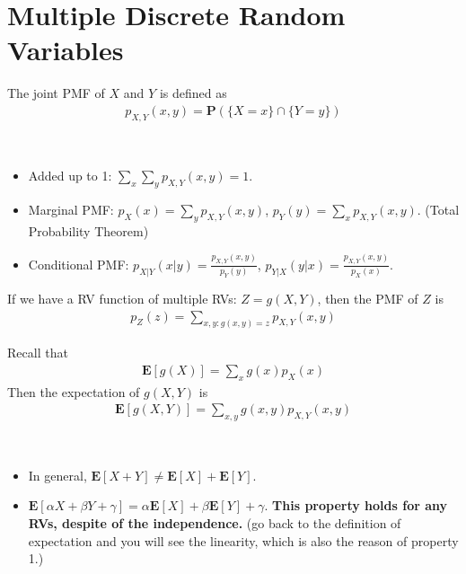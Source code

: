 \section{Multiple Discrete Random Variables}
\begin{definition}
    The joint PMF of $X$ and $Y$ is defined as
    \begin{align}
        p_{X, Y}(x, y) = \mathbf{P}(\{X = x\} \cap \{Y = y\})
    \end{align}
\end{definition}
\begin{property} ~
    \begin{itemize}
        \item Added up to 1: $\sum_x \sum_y p_{X, Y}(x, y) = 1$.
        \item Marginal PMF: $p_{X}(x) = \sum_y p_{X, Y}(x, y)$, $p_{Y}(y) = \sum_x p_{X, Y}(x, y)$. (Total Probability Theorem)
        \item Conditional PMF: $p_{X|Y}(x|y) = \frac{p_{X, Y}(x, y)}{p_{Y}(y)}$, $p_{Y|X}(y|x) = \frac{p_{X, Y}(x, y)}{p_{X}(x)}$.
    \end{itemize}
\end{property}
If we have a RV function of multiple RVs: $Z = g(X, Y)$, then the PMF of $Z$ is
\begin{align}
    p_{Z}(z) = \sum_{x, y: g(x, y) = z} p_{X, Y}(x, y)
\end{align}
\begin{definition}
    Recall that 
    \begin{align*}
        \mathbf{E}[g(X)] = \sum_{x} g(x) p_{X}(x)
    \end{align*}
    Then the expectation of $g(X, Y)$ is
    \begin{align}
        \mathbf{E}[g(X, Y)] = \sum_{x, y} g(x, y) p_{X, Y}(x, y)
    \end{align}
\end{definition}
\begin{property} ~
    \begin{itemize}
        \item In general, $\mathbf{E}[X + Y] \neq \mathbf{E}[X] + \mathbf{E}[Y]$.
        \item $\mathbf{E}[\alpha X + \beta Y + \gamma] = \alpha \mathbf{E}[X] + \beta \mathbf{E}[Y] + \gamma$. \textbf{This property holds for any RVs, despite of the independence.} (go back to the definition of expectation and you will see the linearity, which is also the reason of property 1.)
    \end{itemize}
\end{property}
